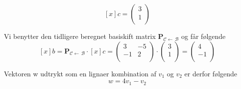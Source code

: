 \documentclass[12pt]{article}
\begin{document}
\begin{enumerate}[(a)]
$$[x]c = \left(\begin{array}{c}
3\\
1\\
\end{array}\right)
$$

Vi benytter den tidligere beregnet basiskift matrix
$\mathbf{P}_{\mathcal{C}\leftarrow \,\mathcal{B}}$
og får følgende
$$
[x]b =\mathbf{P}_{\mathcal{C}\leftarrow \,\mathcal{B}} \cdot [x]c = 
\left(\begin{array}{cc}
3&-5\\
-1&2\\
\end{array}\right) \cdot
\left(\begin{array}{c}
3\\
1\\
\end{array}\right) =
\left(\begin{array}{c}
4\\
-1\\
\end{array}\right)
$$

Vektoren w udtrykt som en lignaer kombination af $v_1$ og $v_2$ er derfor
følgende $$w = 4v_1 - v_2$$ 
\end{enumerate}
\end{document}
